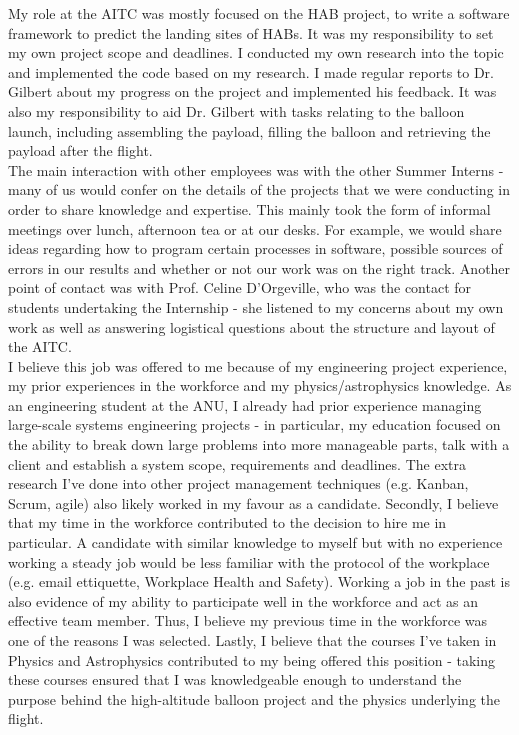 \documentclass[11pt]{article}
\begin{document}
My role at the AITC was mostly focused on the HAB project, to write a software framework to predict the landing sites of HABs. It was my responsibility to set my own project scope and deadlines. I conducted my own research into the topic and implemented the code based on my research. I made regular reports to Dr. Gilbert about my progress on the project and implemented his feedback. It was also my responsibility to aid Dr. Gilbert with tasks relating to the balloon launch, including assembling the payload, filling the balloon and retrieving the payload after the flight. \\ 

The main interaction with other employees was with the other Summer Interns - many of us would confer on the details of the projects that we were conducting in order to share knowledge and expertise. This mainly took the form of informal meetings over lunch, afternoon tea or at our desks. For example, we would share ideas regarding how to program certain processes in software, possible sources of errors in our results and whether or not our work was on the right track. Another point of contact was with Prof. Celine D'Orgeville, who was the contact for students undertaking the Internship - she listened to my concerns about my own work as well as answering logistical questions about the structure and layout of the AITC. \\

I believe this job was offered to me because of my engineering project experience, my prior experiences in the workforce and my physics/astrophysics knowledge. As an engineering student at the ANU, I already had prior experience managing large-scale systems engineering projects - in particular, my education focused on the ability to break down large problems into more manageable parts, talk with a client and establish a system scope, requirements and deadlines. The extra research I've done into other project management techniques (e.g. Kanban, Scrum, agile) also likely worked in my favour as a candidate. Secondly, I believe that my time in the workforce contributed to the decision to hire me in particular. A candidate with similar knowledge to myself but with no experience working a steady job would be less familiar with the protocol of the workplace (e.g. email ettiquette, Workplace Health and Safety). Working a job in the past is also evidence of my ability to participate well in the workforce and act as an effective team member. Thus, I believe my previous time in the workforce was one of the reasons I was selected. Lastly, I believe that the courses I've taken in Physics and Astrophysics contributed to my being offered this position - taking these courses ensured that I was knowledgeable enough to understand the purpose behind the high-altitude balloon project and the physics underlying the flight. \\
\end{document}
